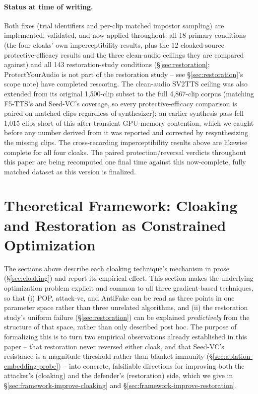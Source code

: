 \documentclass[11pt]{article}
\begin{document}
\paragraph{Status at time of writing.} Both fixes (trial identifiers
and per-clip matched impostor sampling) are implemented, validated,
and now applied throughout: all 18 primary conditions (the four
cloaks' own imperceptibility results, plus the 12 cloaked-source
protective-efficacy results and the three clean-audio ceilings they
are compared against) and all 143 restoration-study conditions
(\S\ref{sec:restoration}; ProtectYourAudio is not part of the
restoration study -- see \S\ref{sec:restoration}'s scope note) have
completed rescoring. The clean-audio SV2TTS ceiling was also extended
from its original 1,500-clip subset to the full 4,867-clip corpus
(matching F5-TTS's and Seed-VC's coverage, so every protective-efficacy
comparison is paired on matched clips regardless of synthesizer); an
earlier synthesis pass fell 1,015 clips short of this after transient
GPU-memory contention, which we caught before any number derived from
it was reported and corrected by resynthesizing the missing clips. The
cross-recording imperceptibility results above are likewise complete
for all four cloaks. The paired protection/reversal verdicts
throughout this paper are being recomputed one final time against this
now-complete, fully matched dataset as this version is finalized.

\section{Theoretical Framework: Cloaking and Restoration as Constrained Optimization}
\label{sec:framework}

The sections above describe each cloaking technique's mechanism in
prose (\S\ref{sec:cloaking}) and report its empirical effect. This
section makes the underlying optimization problem explicit and common
to all three gradient-based techniques, so that (i) POP, attack-vc,
and AntiFake can be read as three points in one parameter space rather
than three unrelated algorithms, and (ii) the restoration study's
uniform failure (\S\ref{sec:restoration}) can be explained
\emph{predictively} from the structure of that space, rather than only
described post hoc. The purpose of formalizing this is to turn two
empirical observations already established in this paper -- that
restoration never reversed either cloak, and that Seed-VC's resistance
is a magnitude threshold rather than blanket immunity
(\S\ref{sec:ablation-embedding-probe}) -- into concrete, falsifiable
directions for improving both the attacker's (cloaking) and the
defender's (restoration) side, which we give in
\S\ref{sec:framework-improve-cloaking} and
\S\ref{sec:framework-improve-restoration}.
\end{document}
